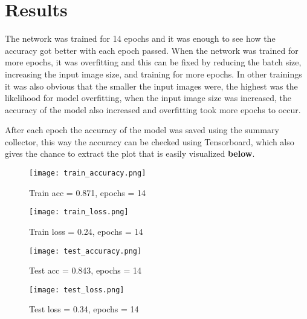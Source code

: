 \documentclass{article}
\begin{document}
\begin{adjustwidth}{-40pt}{-40pt}
\begin{itemize}
\end{itemize}


\section{Results}

The network was trained for 14 epochs and it was enough to see how the accuracy got better with each epoch passed. When the network was trained for more epochs, it was overfitting and this can be fixed by reducing the batch size, increasing the input image size, and training for more epochs. In other trainings it was also obvious that the smaller the input images were, the highest was the likelihood for model overfitting, when the input image size was increased, the accuracy of the model also increased and overfitting took more epochs to occur.

After each epoch the accuracy of the model was saved using the summary collector, this way the accuracy can be checked using Tensorboard, which also gives the chance to extract the plot that is easily visualized \textbf{below}.

\begin{figure}[h!]
\centering
\texttt{[image: train\_accuracy.png]}
\caption{Train acc = 0.871, epochs = 14}
\label{Train acc}
\end{figure}

\begin{figure}[h!]
\centering
\texttt{[image: train\_loss.png]}
\caption{Train loss = 0.24, epochs = 14}
\label{Train loss}
\end{figure}

\begin{figure}[h!]
\centering
\texttt{[image: test\_accuracy.png]}
\caption{Test acc = 0.843, epochs = 14}
\label{Test acc}
\end{figure}

\begin{figure}[h!]
\centering
\texttt{[image: test\_loss.png]}
\caption{Test loss = 0.34, epochs = 14}
\label{Test loss}
\end{figure}


\end{adjustwidth}
\end{document}
